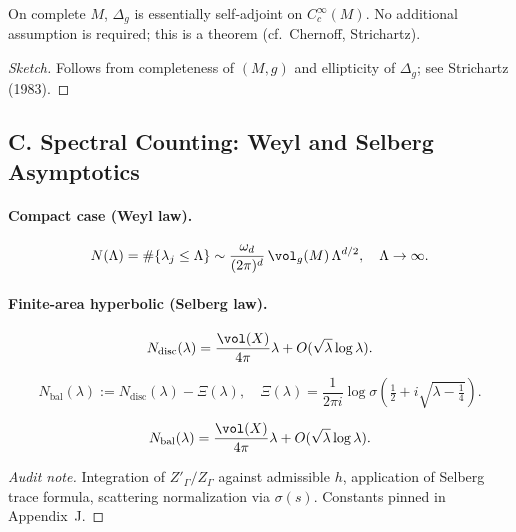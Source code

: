 \begin{lemma}
\label{lem:esa}
On complete $M$, $\Delta_g$ is essentially self-adjoint on $C_c^\infty(M)$. No additional assumption is required; this is a theorem (cf.\ Chernoff, Strichartz). 
\end{lemma}

\begin{proof}[Sketch]
Follows from completeness of $(M,g)$ and ellipticity of $\Delta_g$; see Strichartz (1983).
\end{proof}


\subsection*{C. Spectral Counting: Weyl and Selberg Asymptotics}
\label{subsec:weyl-sharp-patched}

\paragraph{Compact case (Weyl law).}
\[
  N(\Lambda)=\#\{\lambda_j\le\Lambda\}
  \sim \frac{\omega_d}{(2\pi)^d}\,\vol_g(M)\,\Lambda^{d/2},\quad \Lambda\to\infty.
\]

\paragraph{Finite-area hyperbolic (Selberg law).}
\[
  N_{\mathrm{disc}}(\lambda)=\frac{\vol(X)}{4\pi}\lambda+O(\sqrt{\lambda}\log\lambda).
\]

\begin{definition}
\[
  N_{\mathrm{bal}}(\lambda):=N_{\mathrm{disc}}(\lambda)-\Xi(\lambda),\quad
  \Xi(\lambda)=\frac{1}{2\pi i}\log\sigma(\tfrac12+i\sqrt{\lambda-\tfrac14}).
\]
\end{definition}

\begin{theorem}
\[
  N_{\mathrm{bal}}(\lambda)
  = \frac{\vol(X)}{4\pi}\lambda + O(\sqrt{\lambda}\log\lambda).
\]
\end{theorem}

\begin{proof}[Audit note]
Integration of $Z'_\Gamma/Z_\Gamma$ against admissible $h$, application of Selberg trace formula, scattering normalization via $\sigma(s)$. Constants pinned in Appendix~J.
\end{proof}

